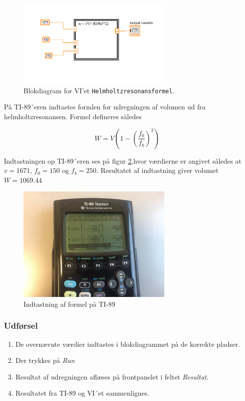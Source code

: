 		\begin{figure}
			\centering
			\includegraphics[width=3in]{HelmholtzformelLabVIEW}
			\caption{Blokdiagram for VI'et \texttt{Helmholtzresonansformel}.}
			\label{fig:HHRF}
		\end{figure}
		
		På TI-89´eren indtastes formlen for udregningen af volumen ud fra helmholtzresonansen. Formel defineres således 
		
		\begin{equation}
		W = V\left(1-\left(\frac{f_{0}}{f_{b}}\right)^2\right)
		\end{equation}
		
		Indtastningen op TI-89´eren ses på figur \ref{fig:TI89},hvor værdierne er angivet således at $v=1671$, $f_0=150$ og $f_b=250$. Resultatet af indtastning giver volumet $W=1069.44$
		
		\begin{figure}
			\centering
			\includegraphics[width=3in]{TI-89}
			\caption{Indtastning af formel på TI-89 }
			\label{fig:TI89}
		\end{figure}
		
	
	
		\subsubsection{Udførsel}
			 
         \begin{enumerate}
         \item De overnævnte værdier indtastes i blokdiagrammet på de korrekte pladser.
         \item Der trykkes på \textit{Run} 
         \item Resultat af udregningen aflæses på frontpanelet i feltet \textit{Resultat}. 
         \item Resultatet fra TI-89 og VI´et sammenlignes.  
         \end{enumerate}
         
